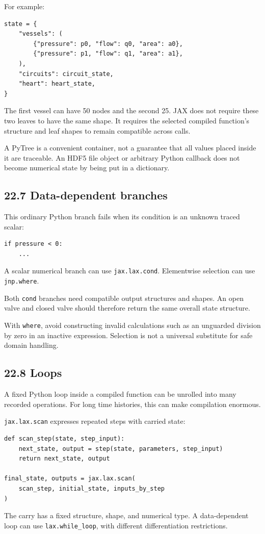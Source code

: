 \documentclass[11pt,a4paper]{article}
\begin{document}
For example:


\begin{lstlisting}
state = {
    "vessels": (
        {"pressure": p0, "flow": q0, "area": a0},
        {"pressure": p1, "flow": q1, "area": a1},
    ),
    "circuits": circuit_state,
    "heart": heart_state,
}
\end{lstlisting}
The first vessel can have 50 nodes and the second 25. JAX does not require these two leaves to have the same shape. It requires the selected compiled function's structure and leaf shapes to remain compatible across calls.

A PyTree is a convenient container, not a guarantee that all values placed inside it are traceable. An HDF5 file object or arbitrary Python callback does not become numerical state by being put in a dictionary.

\subsection{22.7 Data-dependent branches}
This ordinary Python branch fails when its condition is an unknown traced scalar:


\begin{lstlisting}
if pressure < 0:
    ...
\end{lstlisting}
A scalar numerical branch can use \texttt{jax.\allowbreak{}lax.\allowbreak{}cond}. Elementwise selection can use \texttt{jnp.\allowbreak{}where}.

Both \texttt{cond} branches need compatible output structures and shapes. An open valve and closed valve should therefore return the same overall state structure.

With \texttt{where}, avoid constructing invalid calculations such as an unguarded division by zero in an inactive expression. Selection is not a universal substitute for safe domain handling.

\subsection{22.8 Loops}
A fixed Python loop inside a compiled function can be unrolled into many recorded operations. For long time histories, this can make compilation enormous.

\texttt{jax.\allowbreak{}lax.\allowbreak{}scan} expresses repeated steps with carried state:


\begin{lstlisting}
def scan_step(state, step_input):
    next_state, output = step(state, parameters, step_input)
    return next_state, output

final_state, outputs = jax.lax.scan(
    scan_step, initial_state, inputs_by_step
)
\end{lstlisting}
The carry has a fixed structure, shape, and numerical type. A data-dependent loop can use \texttt{lax.\allowbreak{}while\_\allowbreak{}loop}, with different differentiation restrictions.
\end{document}
